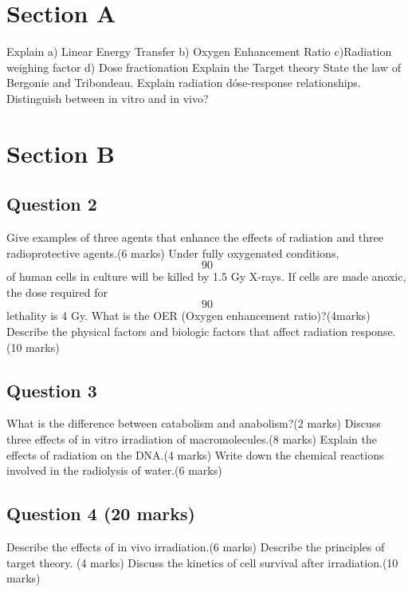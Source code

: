 \documentclass{assignment}
\date{\today}                                   %
\begin{document}
\begin{problem}

\section{Section A}
\noindent Explain a) Linear Energy Transfer b) Oxygen Enhancement Ratio c)Radiation weighing factor d) Dose fractionation
\noindent Explain the Target theory
\noindent State the law of Bergonie and Tribondeau.
\noindent Explain radiation dóse-response relationships.
\noindent Distinguish between in vitro and in vivo?
\section{Section B}
\subsection{Question 2}
\noindent Give examples of three agents that enhance the effects of radiation and three radioprotective agents.(6 marks)
\noindent 
Under fully oxygenated conditions, \begin{equation}90%
\end{equation} of human cells in culture will be killed by 1.5 Gy X-rays. If
cells are made anoxic, the dose required for \begin{equation}
    90%
\end{equation} lethality is 4 Gy. What is the OER (Oxygen enhancement ratio)?(4marks)
\noindent 
Describe the physical factors and biologic factors that affect radiation response.(10 marks)
\subsection*{Question 3}
\noindent What is the difference between catabolism and anabolism?(2 marks)
\noindent Discuss three effects of in vitro irradiation of macromolecules.(8 marks)
\noindent Explain the effects of radiation on the DNA.(4 marks)
\noindent Write down the chemical reactions involved in the radiolysis of water.(6 marks)
\subsection*{Question 4 (20 marks)} 

\noindent Describe the effects of in vivo irradiation.(6 marks)
\noindent Describe the principles of target theory. (4 marks)
\noindent 
Discuss the kinetics of cell survival after irradiation.(10 marks)

\end{problem}
\end{document}
